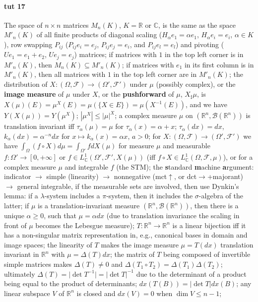 \documentclass[a4paper]{article}
\newcommand{\Fcal}{\mathcal{F}}
\newcommand{\Bcal}{\mathcal{B}}
\newcommand{\real}{\mathbb{R}}
\newcommand{\cplx}{\mathbb{C}}
\begin{document}


\paragraph{tut 17} %
\label{par:tut_17}

The space of $n\times n$ matrices $M_n(K)$, $K = \real$ or $\cplx$, is the same as
the space $M'_n(K)$ of all finite products of diagonal scaling ($H_\alpha e_1 = \alpha e_1$,
$H_\alpha e_i = e_i$, $\alpha \in K$), row swapping $P_{ij}$ ($P_{ij} e_i = e_j$,
$P_{ij} e_j = e_i$, and $P_{ij} e_l = e_l$) and pivoting ($U e_1 = e_1 + e_2$, $U e_j = e_j$)
matrices;
%
if matrices with $1$ in the top left corner is in $M'_n(K)$, then $M_n(K)\subseteq M'_n(K)$;
%
if matrices with $e_1$ in its first column is in $M'_n(K)$, then all matrices with
$1$ in the top left corner are in $M'_n(K)$;
%
the distribution of $X\colon (\Omega, \Fcal) \to (\Omega', \Fcal')$ under $\mu$ (possibly
complex), or the {\bf image measure} of $\mu$ under $X$, or the {\bf pushforward} of
$\mu$, $X_\sharp\mu$, is $X(\mu)(E) = \mu^X(E) = \mu(\{X \in E\}) = \mu(X^{-1}(E))$,
and we have $Y(X(\mu)) = Y(\mu^X)$;
%
$|\mu^X| \leq |\mu|^X$;
%
a complex measure $\mu$ on $(\real^n, \Bcal(\real^n))$ is translation invariant iff
$\tau_\alpha(\mu) = \mu$ for $\tau_\alpha(x) = \alpha + x$;
%
$\tau_\alpha(dx) = dx$, $k_\alpha(dx) = \alpha^{-n} dx$ for $x\mapsto k_\alpha(x) =
\alpha x$, $a > 0$;
%
for $X\colon (\Omega, \Fcal) \to (\Omega', \Fcal')$ we have $\int_{\Omega} (f \circ X)
d\mu = \int_{\Omega'} f dX(\mu)$ for measure $\mu$ and measurable $f\colon \Omega' \to
[0, +\infty]$ or $f\in L^1_\cplx(\Omega', \Fcal', X(\mu))$ (iff $f\circ X \in
L^1_\cplx(\Omega, \Fcal, \mu)$), or for a complex measure $\mu$ and integrable
$f$ (the STM);
%
the \textbf{s}tandard \textbf{m}achine \textbf{a}rgument: indicator $\to$ simple
(linearity) $\to$ nonnegative (mct$\uparrow$, or dct$\to$+majorant) $\to$ general
integrable, if the measurable sets are involved, then use Dynkin's lemma: if a
$\lambda$-system includes a $\pi$-system, then it includes the $\sigma$-algebra
of the latter;
%
if $\mu$ is a translation-invariant measure $(\real^n, \Bcal(\real^n))$, then there
is a unique $\alpha \geq 0$, such that $\mu = \alpha dx$ (due to translation invariance
the scaling in front of $\mu$ becomes the Lebesgue measure);
%
$T\colon \real^n \to \real^n$ is a linear bijection iff it has a non-singular matrix
representation in, e.g., canonical bases in domain and image spaces;
%
the linearity of $T$ makes the image measure $\mu = T(dx)$ translation invariant in
$\real^n$ with $\mu = \Delta(T) dx$;
%
the matrix of $T$ being composed of invertible simple matrices makes $\Delta(T) \neq
0$ and $\Delta(T_1 \circ T_2) = \Delta(T_1) \Delta(T_2)$;
%
ultimately $\Delta(T) = \lvert \det T^{-1} \rvert = \lvert \det T \rvert^{-1}$ due
to the determinant of a product being equal to the product of determinants;
%
$dx(T(B)) = \lvert \det T\rvert dx(B)$;
%
any linear subspace $V$ of $\real^n$ is closed and $dx(V) = 0$ when $\dim V \leq n-1$;
\end{document}
